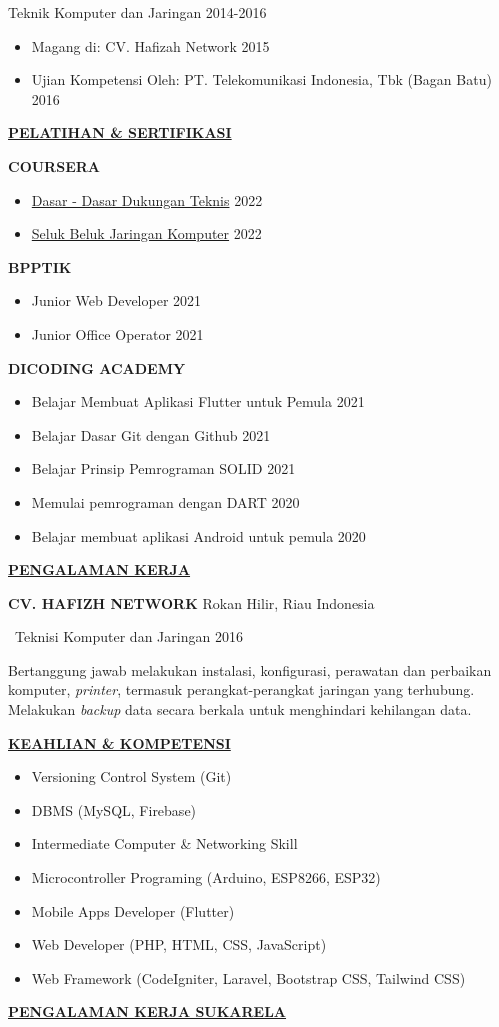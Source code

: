 \documentclass{scrbook}
\begin{document}
Teknik Komputer dan Jaringan 2014-2016
\begin{itemize}
\item Magang di: CV. Hafizah Network 2015
\item Ujian Kompetensi Oleh: PT. Telekomunikasi Indonesia, Tbk (Bagan Batu) 2016
\end{itemize}
\uppercase{\textbf{\uline{Pelatihan \& sertifikasi}}} 

\uppercase{\textbf{Coursera}}
\begin{itemize}
\item \href{https://coursera.org/verify/KHQWR9GBV8JN}{Dasar - Dasar Dukungan Teknis} 2022
\item \href{https://coursera.org/verify/D936FCCK8JXC}{Seluk Beluk Jaringan Komputer} 2022
\end{itemize}
\uppercase{\textbf{BPPTIK}}
\begin{itemize}
\item Junior Web Developer \uppercase{2021}
\item Junior Office Operator 2021
\end{itemize}
\uppercase{\textbf{Dicoding Academy}} 
\begin{itemize}
\item Belajar Membuat Aplikasi Flutter untuk Pemula 2021
\item Belajar Dasar Git dengan Github  2021
\item Belajar Prinsip Pemrograman SOLID 2021
\item Memulai pemrograman dengan DART \uppercase{2020}
\item Belajar membuat aplikasi Android untuk pemula \uppercase{2020}
\end{itemize}
\uppercase{\textbf{\uline{Pengalaman Kerja}}} 

\uppercase{\textbf{Cv. Hafizh Network}} Rokan Hilir, Riau Indonesia

{\textbullet}~Teknisi Komputer dan Jaringan \uppercase{2016}

Bertanggung jawab melakukan instalasi, konfigurasi, perawatan dan perbaikan komputer, \textit{printer}, termasuk perangkat-perangkat jaringan yang terhubung. Melakukan \textit{backup} data secara berkala untuk menghindari kehilangan data. 

\uppercase{\textbf{\uline{Keahlian \& kompetensi}}} 
\begin{itemize}
\item Versioning Control System (Git)
\item DBMS (MySQL, Firebase)
\item Intermediate Computer \& Networking Skill 
\item Microcontroller Programing (Arduino, ESP8266, ESP32)
\item Mobile Apps Developer (Flutter)
\item Web Developer (PHP, HTML, CSS, JavaScript)
\item Web Framework (CodeIgniter, Laravel, Bootstrap CSS, Tailwind CSS)
\end{itemize}
\uppercase{\textbf{\uline{Pengalaman kerja sukarela}}} 
\end{document}
